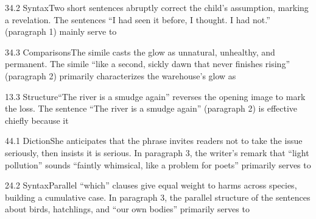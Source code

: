 \documentclass[11pt]{article}
\begin{document}
\begin{q}{3}{4.2 Syntax}{Two short sentences abruptly correct the child's assumption, marking a revelation.}
The sentences ``I had seen it before, I thought. I had not.'' (paragraph 1) mainly serve to
\end{q}

\begin{q}{3}{4.3 Comparisons}{The simile casts the glow as unnatural, unhealthy, and permanent.}
The simile ``like a second, sickly dawn that never finishes rising'' (paragraph 2) primarily characterizes the warehouse's glow as
\end{q}

\begin{q}{1}{3.3 Structure}{``The river is a smudge again'' reverses the opening image to mark the loss.}
The sentence ``The river is a smudge again'' (paragraph 2) is effective chiefly because it
\end{q}

\begin{q}{4}{4.1 Diction}{She anticipates that the phrase invites readers not to take the issue seriously, then insists it is serious.}
In paragraph 3, the writer's remark that ``light pollution'' sounds ``faintly whimsical, like a problem for poets'' primarily serves to
\end{q}

\begin{q}{2}{4.2 Syntax}{Parallel ``which'' clauses give equal weight to harms across species, building a cumulative case.}
In paragraph 3, the parallel structure of the sentences about birds, hatchlings, and ``our own bodies'' primarily serves to
\end{q}
\end{document}
